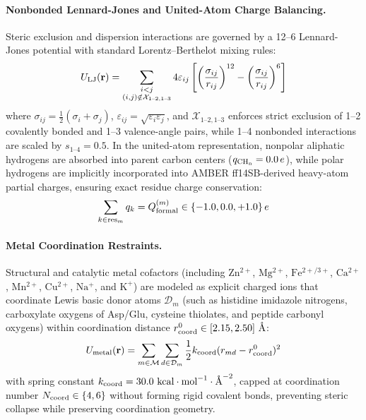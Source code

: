 \documentclass[journal=jpcbfk,manuscript=article]{achemso}
\begin{document}
\paragraph{Nonbonded Lennard-Jones and United-Atom Charge Balancing.}
Steric exclusion and dispersion interactions are governed by a 12--6 Lennard-Jones potential with standard Lorentz--Berthelot mixing rules:\cite{weiner1984all}
\begin{equation}
U_{\rm LJ}(\mathbf{r}) = \sum_{\substack{i < j \\ (i,j) \notin \mathcal{X}_{1\text{--}2, 1\text{--}3}}} 4 \varepsilon_{ij} \left[ \left(\frac{\sigma_{ij}}{r_{ij}}\right)^{12} - \left(\frac{\sigma_{ij}}{r_{ij}}\right)^6 \right]
\end{equation}
where $\sigma_{ij} = \frac{1}{2}(\sigma_i + \sigma_j)$, $\varepsilon_{ij} = \sqrt{\varepsilon_i \varepsilon_j}$, and $\mathcal{X}_{1\text{--}2, 1\text{--}3}$ enforces strict exclusion of 1--2 covalently bonded and 1--3 valence-angle pairs, while 1--4 nonbonded interactions are scaled by $s_{1\text{--}4} = 0.5$. In the united-atom representation, nonpolar aliphatic hydrogens are absorbed into parent carbon centers ($q_{\rm CH_n} = 0.0\,e$), while polar hydrogens are implicitly incorporated into AMBER ff14SB-derived heavy-atom partial charges, ensuring exact residue charge conservation:\cite{case2005amber,maier2015ff14sb}
\begin{equation}
\sum_{k \in {\rm res}_m} q_k = Q_{\rm formal}^{(m)} \in \{-1.0, 0.0, +1.0\}\,e
\end{equation}

\paragraph{Metal Coordination Restraints.}
Structural and catalytic metal cofactors (including $\mathrm{Zn^{2+}}$, $\mathrm{Mg^{2+}}$, $\mathrm{Fe^{2+/3+}}$, $\mathrm{Ca^{2+}}$, $\mathrm{Mn^{2+}}$, $\mathrm{Cu^{2+}}$, $\mathrm{Na^+}$, and $\mathrm{K^+}$) are modeled as explicit charged ions that coordinate Lewis basic donor atoms $\mathcal{D}_m$ (such as histidine imidazole nitrogens, carboxylate oxygens of Asp/Glu, cysteine thiolates, and peptide carbonyl oxygens) within coordination distance $r_{\rm coord}^0 \in [2.15, 2.50]\text{ \AA}$:\cite{case2005amber}
\begin{equation}
U_{\rm metal}(\mathbf{r}) = \sum_{m \in \mathcal{M}} \sum_{d \in \mathcal{D}_m} \frac{1}{2} k_{\rm coord} (r_{md} - r_{\rm coord}^0)^2
\end{equation}
with spring constant $k_{\rm coord} = 30.0\text{ kcal}\cdot\text{mol}^{-1}\cdot\text{\AA}^{-2}$, capped at coordination number $N_{\rm coord} \in \{4, 6\}$ without forming rigid covalent bonds, preventing steric collapse while preserving coordination geometry.
\end{document}
